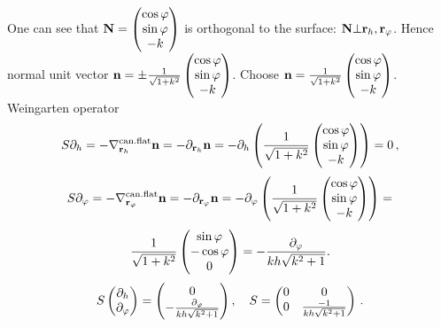 \documentclass[12pt]{article}
\theoremstyle{theorem}
\numberwithin{equation}{section}
\begin{document}
  One can see that  ${\bf N}=
      \begin{pmatrix}
        \cos \varphi\cr
        \sin\varphi\cr
        -k\cr
   \end{pmatrix}$ is orthogonal to the surface: ${\bf N}\bot {\bf r}_h,{\bf r}_\varphi$. Hence
   normal unit vector ${\bf n}=\pm
     {1\over {\sqrt {1+k^2}}}
      \begin{pmatrix}
        \cos \varphi\cr
        \sin\varphi\cr
        -k\cr
   \end{pmatrix}$. Choose ${\bf n}=
   {1\over {\sqrt {1+k^2}}}
      \begin{pmatrix}
        \cos \varphi\cr
        \sin\varphi\cr
        -k\cr
   \end{pmatrix}$.
     Weingarten operator
     \begin{equation*}\label{weingrartenforcylinder}
        S\partial_h=-\nabla^{\rm can.flat}_{{\bf r}_h}{\bf n}=-\partial_{{\bf r}_h} {\bf n}=
        -\partial_h
        \left(
        {1\over {\sqrt {1+k^2}}}
      \begin{pmatrix}
        \cos \varphi\cr
        \sin\varphi\cr
        -k\cr
   \end{pmatrix}
   \right)
        =0\,,
     \end{equation*}
\begin{equation*}\label{weingrartenforcylinder}
        S\partial_\varphi=-\nabla^{\rm can.flat}_{{\bf r}_\varphi}{\bf n}=-\partial_{{\bf r}_\varphi} {\bf n}=
        -\partial_\varphi
        \left(
{1\over {\sqrt {1+k^2}}}
      \begin{pmatrix}
        \cos \varphi\cr
        \sin\varphi\cr
        -k\cr
   \end{pmatrix}
   \right)
       =
       \end{equation*}
       \begin{equation*}
       {1\over {\sqrt {1+k^2}}}
       \begin{pmatrix}
        \sin\varphi \cr
        -\cos\varphi\cr
        0\cr
   \end{pmatrix}=-{\partial_\varphi\over kh\sqrt {k^2+1}}.
    \end{equation*}
\begin{equation}\label{weingrartenforcylinder2}
           S
   \begin{pmatrix}
        \partial_h \cr
        \partial_\varphi\cr
   \end{pmatrix}=
   \begin{pmatrix}
         0\cr
        -{\partial_\varphi\over kh\sqrt {k^2+1}}\cr
   \end{pmatrix},\quad S=\begin{pmatrix}0&0\cr 0 &{-1\over kh\sqrt {k^2+1}}\end{pmatrix}\,.
    \end{equation}
\end{document}
